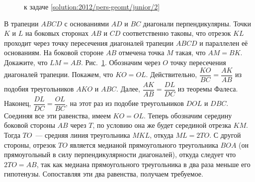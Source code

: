 \ifsolution
\begin{figure}\centering
    \caption{к задаче \ref{solution:2012/pers-geomt/junior/2}}
    \label{fig:solution:2012/pers-geomt/junior/2}
\end{figure}
\fi %

\problem
В трапеции $ABCD$ с основаниями $AD$ и $BC$ диагонали перпендикулярны.
Точки $K$ и $L$ на боковых сторонах $AB$ и $CD$ соответственно таковы, что
отрезок $KL$ проходит через точку пересечения диагоналей трапеции $ABCD$ и
параллелен её основаниям.
На боковой стороне $AB$ отмечена точка $M$ такая, что $AM = BK$.
Докажите, что $LM = AB$.
\solution
\label{solution:2012/pers-geomt/junior/2}%
Рис.~\ref{fig:solution:2012/pers-geomt/junior/2}.
Обозначим через $O$ точку пересечения диагоналей трапеции.
Покажем, что $KO = OL$.
Действительно, $\dfrac{KO}{BC} = \dfrac{AK}{AB}$ из подобия треугольников
$AKO$ и $ABC$.
Далее, $\dfrac{AK}{AB} = \dfrac{DL}{DC}$ из теоремы Фалеса.
Наконец, $\dfrac{DL}{DC} = \dfrac{OL}{BC}$, на этот раз из подобие
треугольников $DOL$ и $DBC$.
Соединяя все эти равенства, имеем $KO = OL$.
Теперь обозначим середину боковой стороны $AB$ через $T$, по условию она же
будет серединой отрезка $KM$.
Тогда $TO$~--- средняя линия треугольника $MKL$, откуда $ML = 2 TO$.
С другой стороны, отрезок $TO$ является медианой прямоугольного треугольника
$BOA$
(он прямоугольный в силу перпендикулярности диагоналей),
откуда следует что $2 TO = AB$, так как медиана прямоугольного треугольника в
два раза меньше его гипотенузы.
Сопоставляя эти два равенства, получаем требуемое.
\endproblem
